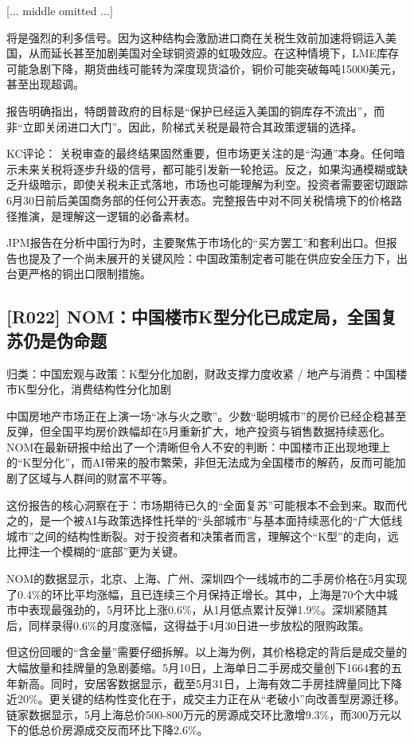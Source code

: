 \documentclass[11pt]{ctexart}
\begin{document}
[... middle omitted ...]

将是强烈的利多信号。因为这种结构会激励进口商在关税生效前加速将铜运入美国，从而延长甚至加剧美国对全球铜资源的虹吸效应。在这种情境下，LME库存可能急剧下降，期货曲线可能转为深度现货溢价，铜价可能突破每吨15000美元，甚至出现超调。

报告明确指出，特朗普政府的目标是“保护已经运入美国的铜库存不流出”，而非“立即关闭进口大门”。因此，阶梯式关税是最符合其政策逻辑的选择。

KC评论： 关税审查的最终结果固然重要，但市场更关注的是“沟通”本身。任何暗示未来关税将逐步升级的信号，都可能引发新一轮抢运。反之，如果沟通模糊或缺乏升级暗示，即使关税未正式落地，市场也可能理解为利空。投资者需要密切跟踪6月30日前后美国商务部的任何公开表态。完整报告中对不同关税情境下的价格路径推演，是理解这一逻辑的必备素材。

JPM报告在分析中国行为时，主要聚焦于市场化的“买方罢工”和套利出口。但报告也提及了一个尚未展开的关键风险：中国政策制定者可能在供应安全压力下，出台更严格的铜出口限制措施。

\subsection{[R022] NOM：中国楼市K型分化已成定局，全国复苏仍是伪命题}
{\small\color{refgray}归类：中国宏观与政策：K型分化加剧，财政支撑力度收紧 / 地产与消费：中国楼市K型分化，消费结构性分化加剧}

中国房地产市场正在上演一场“冰与火之歌”。少数“聪明城市”的房价已经企稳甚至反弹，但全国平均房价跌幅却在5月重新扩大，地产投资与销售数据持续恶化。NOM在最新研报中给出了一个清晰但令人不安的判断：中国楼市正出现地理上的“K型分化”，而AI带来的股市繁荣，非但无法成为全国楼市的解药，反而可能加剧了区域与人群间的财富不平等。

这份报告的核心洞察在于：市场期待已久的“全面复苏”可能根本不会到来。取而代之的，是一个被AI与政策选择性托举的“头部城市”与基本面持续恶化的“广大低线城市”之间的结构性断裂。对于投资者和决策者而言，理解这个“K型”的走向，远比押注一个模糊的“底部”更为关键。

NOM的数据显示，北京、上海、广州、深圳四个一线城市的二手房价格在5月实现了0.4\%的环比平均涨幅，且已连续三个月保持正增长。其中，上海是70个大中城市中表现最强劲的，5月环比上涨0.6\%，从1月低点累计反弹1.9\%。深圳紧随其后，同样录得0.6\%的月度涨幅，这得益于4月30日进一步放松的限购政策。

但这份回暖的“含金量”需要仔细拆解。以上海为例，其价格稳定的背后是成交量的大幅放量和挂牌量的急剧萎缩。5月10日，上海单日二手房成交量创下1664套的五年新高。同时，安居客数据显示，截至5月31日，上海有效二手房挂牌量同比下降近20\%。更关键的结构性变化在于，成交主力正在从“老破小”向改善型房源迁移。链家数据显示，5月上海总价500-800万元的房源成交环比激增9.3\%，而300万元以下的低总价房源成交反而环比下降2.6\%。
\end{document}
